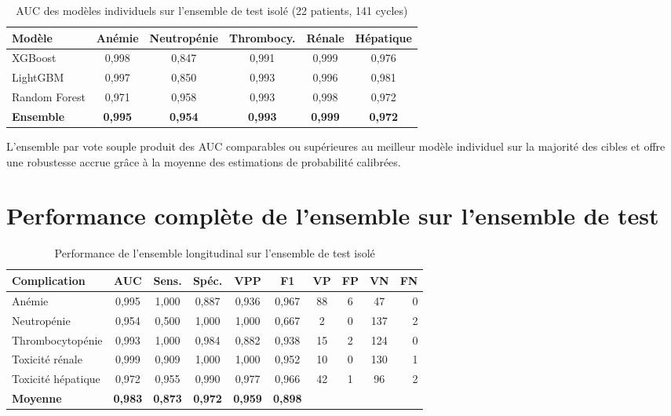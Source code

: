 \documentclass[12pt,a4paper]{report}
\begin{document}
\begin{table}[H]
\centering
\caption{AUC des modèles individuels sur l'ensemble de test isolé (22 patients, 141 cycles)}
\label{tab:individual}
\begin{tabular}{lccccc}
\toprule
\textbf{Modèle} & \textbf{Anémie} & \textbf{Neutropénie} & \textbf{Thrombocy.} & \textbf{Rénale} & \textbf{Hépatique} \\
\midrule
XGBoost       & 0,998 & 0,847 & 0,991 & 0,999 & 0,976 \\
LightGBM      & 0,997 & 0,850 & 0,993 & 0,996 & 0,981 \\
Random Forest & 0,971 & 0,958 & 0,993 & 0,998 & 0,972 \\
\midrule
\textbf{Ensemble} & \textbf{0,995} & \textbf{0,954} & \textbf{0,993} & \textbf{0,999} & \textbf{0,972} \\
\bottomrule
\end{tabular}
\end{table}

L'ensemble par vote souple produit des AUC comparables ou supérieures au meilleur modèle individuel sur la majorité des cibles et offre une robustesse accrue grâce à la moyenne des estimations de probabilité calibrées.

\section{Performance complète de l'ensemble sur l'ensemble de test}

\begin{table}[H]
\centering
{}
\caption{Performance de l'ensemble longitudinal sur l'ensemble de test isolé}
\label{tab:main}
\begin{tabular}{lccccccccr}
\toprule
\textbf{Complication} & \textbf{AUC} & \textbf{Sens.} & \textbf{Spéc.} & \textbf{VPP} & \textbf{F1} & \textbf{VP} & \textbf{FP} & \textbf{VN} & \textbf{FN} \\
\midrule
Anémie             & 0,995 & 1,000 & 0,887 & 0,936 & 0,967 & 88 & 6  & 47  & 0 \\
Neutropénie        & 0,954 & 0,500 & 1,000 & 1,000 & 0,667 & 2  & 0  & 137 & 2 \\
Thrombocytopénie   & 0,993 & 1,000 & 0,984 & 0,882 & 0,938 & 15 & 2  & 124 & 0 \\
Toxicité rénale    & 0,999 & 0,909 & 1,000 & 1,000 & 0,952 & 10 & 0  & 130 & 1 \\
Toxicité hépatique & 0,972 & 0,955 & 0,990 & 0,977 & 0,966 & 42 & 1  & 96  & 2 \\
\midrule
\rowcolor{primaryblue!10}
\textbf{Moyenne} & \textbf{0,983} & \textbf{0,873} & \textbf{0,972} & \textbf{0,959} & \textbf{0,898} & & & & \\
\bottomrule
\end{tabular}
\end{table}
\end{document}
